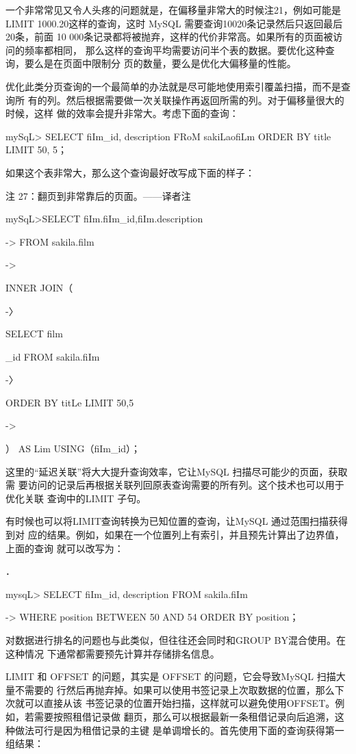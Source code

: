 一个非常常见又令人头疼的问题就是，在偏移量非常大的时候注21，例如可能是LIMIT
1000.20这样的查询，这时 MySQL 需要查询10020条记录然后只返回最后20条，前面
10 000条记录都将被抛弃，这样的代价非常高。如果所有的页面被访问的频率都相同，
那么这样的查询平均需要访问半个表的数据。要优化这种查询，要么是在页面中限制分
页的数量，要么是优化大偏移量的性能。

优化此类分页查询的一个最简单的办法就是尽可能地使用索引覆盖扫描，而不是查询所
有的列。然后根据需要做一次关联操作再返回所需的列。对于偏移量很大的时候，这样
做的效率会提升非常大。考虑下面的查询：

mySqL> SELECT fiIm\_id, description FRoM sakiLaofiLm ORDER BY title LIMIT 50, 5；

如果这个表非常大，那么这个查询最好改写成下面的样子：

注 27：翻页到非常靠后的页面。——译者注

mySqL>SELECT fiIm.fiIm\_id,fiIm.description

-> FROM sakila.film

->

INNER JOIN（

-〉

SELECT film

\_id FROM sakila.fiIm

-〉

ORDER BY titLe LIMIT 50,5

->

） AS Lim USING（fiIm\_id）；

这里的“延迟关联”将大大提升查询效率，它让MySQL 扫描尽可能少的页面，获取需
要访问的记录后再根据关联列回原表查询需要的所有列。这个技术也可以用于优化关联
查询中的LIMIT 子句。

有时候也可以将LIMIT查询转换为已知位置的查询，让MySQL 通过范围扫描获得到对
应的结果。例如，如果在一个位置列上有索引，并且预先计算出了边界值，上面的查询
就可以改写为：

．

mysqL> SELECT fiIm\_id, description FROM sakila.fiIm

-> WHERE position BETWEEN 50 AND 54 ORDER BY position；

对数据进行排名的问题也与此类似，但往往还会同时和GROUP BY混合使用。在这种情况
下通常都需要预先计算并存储排名信息。

LIMIT 和 OFFSET 的问题，其实是 OFFSET 的问题，它会导致MySQL 扫描大量不需要的
行然后再抛弃掉。如果可以使用书签记录上次取数据的位置，那么下次就可以直接从该
书签记录的位置开始扫描，这样就可以避免使用OFFSET。例如，若需要按照租借记录做
翻页，那么可以根据最新一条租借记录向后追溯，这种做法可行是因为租借记录的主键
是单调增长的。首先使用下面的查询获得第一组结果：

